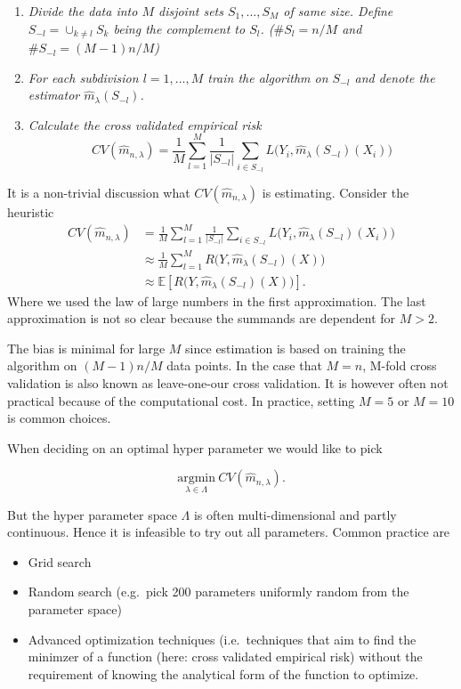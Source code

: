 \documentclass[
]{book}
\providecommand{\tightlist}{%
  \setlength{\itemsep}{0pt}\setlength{\parskip}{0pt}}
\begin{document}
\begin{enumerate}
\def\labelenumi{\arabic{enumi}.}
\tightlist
\item
  \emph{Divide the data into \(M\) disjoint sets \(S_1,...,S_M\) of same size. Define \(S_{-l}=\cup_{k\ne l}S_k\) being the complement to \(S_l\). (\(\#S_l=n/M\) and \(\#S_{-l}=(M-1)n/M\))}
\item
  \emph{For each subdivision \(l=1,...,M\) train the algorithm on \(S_{-l}\) and denote the estimator \(\hat{m}_\lambda(S_{-l})\).}
\item
  \emph{Calculate the cross validated empirical risk}
  \[
    CV(\hat{m}_{n,\lambda})=\frac{1}{M}\sum_{l=1}^M\frac{1}{\vert S_{-l}\vert}\sum_{i\in S_{-l}}L\big(Y_i,\hat{m}_\lambda(S_{-l})(X_i)\big)
    \]
\end{enumerate}

It is a non-trivial discussion what \(CV(\hat{m}_{n,\lambda})\) is estimating. Consider the heuristic
\begin{align*}
CV(\hat{m}_{n,\lambda})&=\frac{1}{M}\sum_{l=1}^M\frac{1}{\vert S_{-l}\vert}\sum_{i\in S_{-l}}L\big(Y_i,\hat{m}_\lambda(S_{-l})(X_i)\big)\\
&\approx \frac{1}{M}\sum_{l=1}^MR\big(Y,\hat{m}_\lambda(S_{-l})(X)\big)\\
&\approx \mathbb{E}\left[R\big(Y,\hat{m}_\lambda(S_{-l})(X)\big)\right].
\end{align*}
Where we used the law of large numbers in the first approximation. The last approximation is not so clear because the summands are dependent for \(M>2\).

The bias is minimal for large \(M\) since estimation is based on training the algorithm on \((M-1)n/M\) data points. In the case that \(M=n\), M-fold cross validation is also known as leave-one-our cross validation. It is however often not practical because of the computational cost. In practice, setting \(M=5\) or \(M=10\) is common choices.

When deciding on an optimal hyper parameter we would like to pick

\[
\underset{\lambda \in \Lambda}{\text{argmin}}\ CV(\hat{m}_{n,\lambda}).
\]

But the hyper parameter space \(\Lambda\) is often multi-dimensional and partly continuous. Hence it is infeasible to try out all parameters. Common practice are

\begin{itemize}
\tightlist
\item
  Grid search
\item
  Random search (e.g.~pick 200 parameters uniformly random from the parameter space)
\item
  Advanced optimization techniques (i.e.~techniques that aim to find the minimzer of a function (here: cross validated empirical risk) without the requirement of knowing the analytical form of the function to optimize.
\end{itemize}
\end{document}
